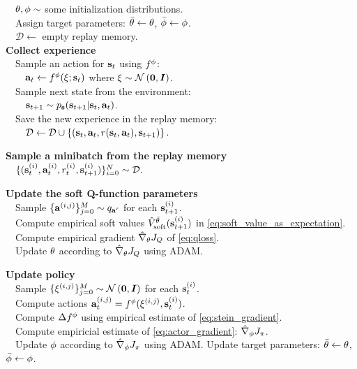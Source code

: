 \documentclass{article}
\begin{document}
\begin{algorithm}[htb]
\caption{Soft Q-learning}
\label{alg:soft-q-learning}
\begin{algorithmic}
\STATE
%
\ \ ${\theta}, {\phi}  \sim$ some initialization distributions.\\
\ \ Assign target parameters: $\bar{{\theta}} \leftarrow {\theta}$, $\bar{{\phi}} \leftarrow {\phi}$. \\
\ \ $\mathcal{D} \leftarrow $ empty replay memory.
%
\vspace{1mm}\\
        \STATE \textbf{Collect experience}\\
   		\ \ Sample an action for ${\mathbf{s}_t}$ using $f^{\phi}$: \\
   		\ \ \ \ ${\mathbf{a}_t} \leftarrow f^{\phi}(\mathbf{\xi}; {\mathbf{s}_t})$ where $\mathbf{\xi} \sim \mathcal{N}\left(\boldsymbol{0}, \boldsymbol{I}\right)$.\\
        \ \ Sample next state from the environment:\\
        \ \ \ \ ${\mathbf{s}_{t+1}} \sim p_{\mathbf{s}}({\mathbf{s}_{t+1}}|{\mathbf{s}_t}, {\mathbf{a}_t})$.\\
        \ \ Save the new experience in the replay memory:\\
        \ \ \ \ $\mathcal{D} \leftarrow \mathcal{D} \cup \left\{({\mathbf{s}_t}, {\mathbf{a}_t}, r({\mathbf{s}_t}, {\mathbf{a}_t}), {\mathbf{s}_{t+1}})\right\}.$

        \STATE\textbf{Sample a minibatch from the replay memory}\\
        \ \ $\{({\mathbf{s}_t^{(i)}}, {\mathbf{a}_t^{(i)}},r^{(i)}_t, {\mathbf{s}_{t+1}^{(i)}})\}_{i=0}^{N}\sim \mathcal{D}.$

        \STATE\textbf{Update the soft Q-function parameters}\\
        \ \ Sample $\{\mathbf{a}^{(i,j)}\}_{j=0}^M \sim q_{\mathbf{a}'}$ for each ${\mathbf{s}_{t+1}^{(i)}}$.\\
        \ \ Compute empirical soft values $\hat{V}_{\mathrm{soft}}^{\bar{\theta}}({\mathbf{s}_{t+1}^{(i)}})$ in \eqref{eq:soft_value_as_expectation}.\\
        \ \ Compute  empirical gradient $\hat\nabla_{\theta}J_Q$ of \eqref{eq:qloss}.\\
        \ \ Update ${\theta}$ according to $\hat\nabla_{\theta}J_Q$ using ADAM.

        \STATE \textbf{Update policy}\\
        \ \ Sample $\{\xi^{(i,j)}\}_{j=0}^M \sim \mathcal{N}\left(\boldsymbol{0}, \boldsymbol{I}\right)$ for each ${\mathbf{s}_t^{(i)}}$.\\
        \ \ Compute actions ${\mathbf{a}_t^{(i,j)}} = f^{\phi}(\xi^{(i,j)}, {\mathbf{s}_t^{(i)}})$.\\
        \ \ Compute $\Delta f^{\phi}$ using empirical estimate of \eqref{eq:stein_gradient}.\\
        \ \ Compute empiricial estimate of \eqref{eq:actor_gradient}: $\hat\nabla_{\phi}J_\pi$.\\
        \ \ Update ${\phi}$ according to $\hat\nabla_{\phi}J_\pi$ using ADAM.
    \ENDFOR
    \STATE Update target parameters: $\bar{{\theta}} \leftarrow {\theta}$, $\bar{{\phi}} \leftarrow {\phi}$.
%
%
    \ENDIF
\ENDFOR
\end{algorithmic}
\end{algorithm}
\end{document}
